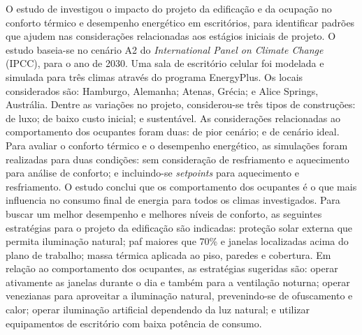 O estudo de  investigou o impacto do projeto da edificação e da ocupação no conforto térmico e desempenho energético em escritórios, para identificar padrões que ajudem nas considerações relacionadas aos estágios iniciais de projeto. O estudo baseia-se no cenário A2 do \textit{International Panel on Climate Change} (IPCC), para o ano de 2030.
Uma sala de escritório celular foi modelada e simulada para três climas através do programa EnergyPlus. Os locais considerados são: Hamburgo, Alemanha; Atenas, Grécia; e Alice Springs, Austrália. Dentre as variações no projeto, considerou-se três tipos de construções: de luxo; de baixo custo inicial; e sustentável. As considerações relacionadas ao comportamento dos ocupantes foram duas: de pior cenário; e de cenário ideal. Para avaliar o conforto térmico e o desempenho energético, as simulações foram realizadas para duas condições: sem consideração de resfriamento e aquecimento para análise de conforto; e incluindo-se \textit{setpoints} para aquecimento e resfriamento.
O estudo conclui que os comportamento dos ocupantes é o que mais influencia no consumo final de energia para todos os climas investigados.
Para buscar um melhor desempenho e melhores níveis de conforto, as seguintes estratégias para o projeto da edificação são indicadas: proteção solar externa que permita iluminação natural; \acrshort{paf} maiores que 70\% e janelas localizadas acima do plano de trabalho; massa térmica aplicada ao piso, paredes e cobertura. Em relação ao comportamento dos ocupantes, as estratégias sugeridas são: operar ativamente as janelas durante o dia e também para a ventilação noturna; operar venezianas para aproveitar a iluminação natural, prevenindo-se de ofuscamento e calor; operar iluminação artificial dependendo da luz natural; e utilizar equipamentos de escritório com baixa potência de consumo.

